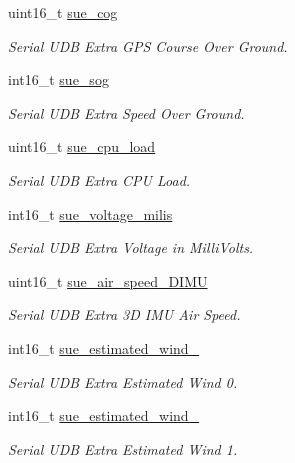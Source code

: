 \begin{DoxyCompactItemize}
uint16\+\_\+t \hyperlink{struct____mavlink__serial__udb__extra__f2__a__t_a18640b9a6ee26a4cfcba77c8eb3513ab}{sue\+\_\+cog}
\begin{DoxyCompactList}\small\item\em Serial U\+D\+B Extra G\+P\+S Course Over Ground. \end{DoxyCompactList}\item 
int16\+\_\+t \hyperlink{struct____mavlink__serial__udb__extra__f2__a__t_ab865910ed367f09f0565bf26a1725d48}{sue\+\_\+sog}
\begin{DoxyCompactList}\small\item\em Serial U\+D\+B Extra Speed Over Ground. \end{DoxyCompactList}\item 
uint16\+\_\+t \hyperlink{struct____mavlink__serial__udb__extra__f2__a__t_a18e40d970626e54f3d434e56fb396e1c}{sue\+\_\+cpu\+\_\+load}
\begin{DoxyCompactList}\small\item\em Serial U\+D\+B Extra C\+P\+U Load. \end{DoxyCompactList}\item 
int16\+\_\+t \hyperlink{struct____mavlink__serial__udb__extra__f2__a__t_a80d6d533d3e675619272392c19a281d3}{sue\+\_\+voltage\+\_\+milis}
\begin{DoxyCompactList}\small\item\em Serial U\+D\+B Extra Voltage in Milli\+Volts. \end{DoxyCompactList}\item 
uint16\+\_\+t \hyperlink{struct____mavlink__serial__udb__extra__f2__a__t_a981a5d9d160a0f86f465c44a6c04fa2a}{sue\+\_\+air\+\_\+speed\+\_\+D\+I\+M\+U}
\begin{DoxyCompactList}\small\item\em Serial U\+D\+B Extra 3\+D I\+M\+U Air Speed. \end{DoxyCompactList}\item 
int16\+\_\+t \hyperlink{struct____mavlink__serial__udb__extra__f2__a__t_a4ba401a31134d3963cd37530c855fd03}{sue\+\_\+estimated\+\_\+wind\+\_}
\begin{DoxyCompactList}\small\item\em Serial U\+D\+B Extra Estimated Wind 0. \end{DoxyCompactList}\item 
int16\+\_\+t \hyperlink{struct____mavlink__serial__udb__extra__f2__a__t_a7d9a071626b28d9e62e2952f0542bed1}{sue\+\_\+estimated\+\_\+wind\+\_}
\begin{DoxyCompactList}\small\item\em Serial U\+D\+B Extra Estimated Wind 1. \end{DoxyCompactList}\item 

\end{DoxyCompactItemize}
